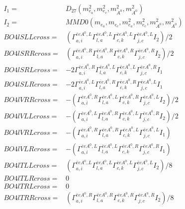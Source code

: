 \documentclass[A4,landscape]{article}
\begin{document}
\begin{align} 
I_1 = & D_{27}(m^2_{e_{{a}}}, m^2_{e_{{c}}}, m^2_{A^0}, m^2_{A^0}) \\ 
I_2 = & MMD0(m_{e_{{a}}}, m_{e_{{c}}}, m^2_{e_{{a}}}, m^2_{e_{{c}}}, m^2_{A^0}, m^2_{A^0}) \\ 
  BO4lSLLcross= & ( \Gamma^{\bar{e}e A^0 ,L}_{a, i} \Gamma^{\bar{e}e A^0 ,L}_{l, a} \Gamma^{\bar{e}e A^0 ,L}_{c, k} \Gamma^{\bar{e}e A^0 ,L}_{j, c} I_2)/2 \\ 
  BO4lSRRcross= & ( \Gamma^{\bar{e}e A^0 ,R}_{a, i} \Gamma^{\bar{e}e A^0 ,R}_{l, a} \Gamma^{\bar{e}e A^0 ,R}_{c, k} \Gamma^{\bar{e}e A^0 ,R}_{j, c} I_2)/2 \\ 
  BO4lSRLcross= & -2  \Gamma^{\bar{e}e A^0 ,R}_{a, i} \Gamma^{\bar{e}e A^0 ,L}_{l, a} \Gamma^{\bar{e}e A^0 ,L}_{c, k} \Gamma^{\bar{e}e A^0 ,R}_{j, c} I_1 \\ 
  BO4lSLRcross= & -2  \Gamma^{\bar{e}e A^0 ,L}_{a, i} \Gamma^{\bar{e}e A^0 ,R}_{l, a} \Gamma^{\bar{e}e A^0 ,R}_{c, k} \Gamma^{\bar{e}e A^0 ,L}_{j, c} I_1 \\ 
  BO4lVRRcross= & -( \Gamma^{\bar{e}e A^0 ,R}_{a, i} \Gamma^{\bar{e}e A^0 ,L}_{l, a} \Gamma^{\bar{e}e A^0 ,R}_{c, k} \Gamma^{\bar{e}e A^0 ,L}_{j, c} I_2)/2 \\ 
  BO4lVLLcross= & -( \Gamma^{\bar{e}e A^0 ,L}_{a, i} \Gamma^{\bar{e}e A^0 ,R}_{l, a} \Gamma^{\bar{e}e A^0 ,L}_{c, k} \Gamma^{\bar{e}e A^0 ,R}_{j, c} I_2)/2 \\ 
  BO4lVRLcross= & -( \Gamma^{\bar{e}e A^0 ,R}_{a, i} \Gamma^{\bar{e}e A^0 ,R}_{l, a} \Gamma^{\bar{e}e A^0 ,L}_{c, k} \Gamma^{\bar{e}e A^0 ,L}_{j, c} I_1) \\ 
  BO4lVLRcross= & -( \Gamma^{\bar{e}e A^0 ,L}_{a, i} \Gamma^{\bar{e}e A^0 ,L}_{l, a} \Gamma^{\bar{e}e A^0 ,R}_{c, k} \Gamma^{\bar{e}e A^0 ,R}_{j, c} I_1) \\ 
  BO4lTLLcross= & ( \Gamma^{\bar{e}e A^0 ,L}_{a, i} \Gamma^{\bar{e}e A^0 ,L}_{l, a} \Gamma^{\bar{e}e A^0 ,L}_{c, k} \Gamma^{\bar{e}e A^0 ,L}_{j, c} I_2)/8 \\ 
  BO4lTLRcross= & 0 \\ 
  BO4lTRLcross= & 0 \\ 
  BO4lTRRcross= & ( \Gamma^{\bar{e}e A^0 ,R}_{a, i} \Gamma^{\bar{e}e A^0 ,R}_{l, a} \Gamma^{\bar{e}e A^0 ,R}_{c, k} \Gamma^{\bar{e}e A^0 ,R}_{j, c} I_2)/8 \\ 
\end{align} 
\end{document}
